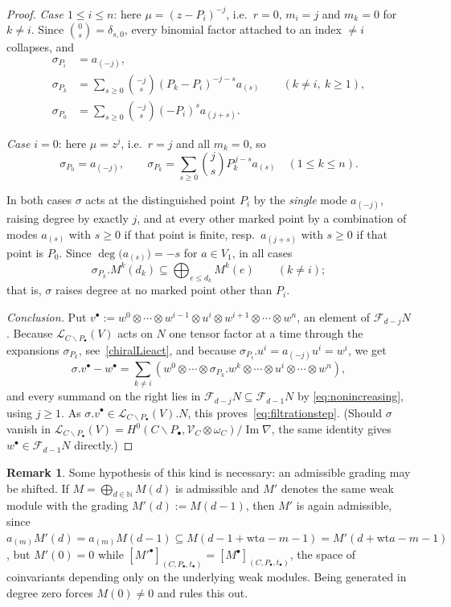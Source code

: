 \documentclass[12pt,a4paper,reqno]{amsart}
\numberwithin{equation}{section}
\theoremstyle{definition}
\newtheorem{remark}[theorem]{Remark}
\newcommand{\im}{\operatorname{Im}}
\newcommand{\N}{\mathbb{N}}
\newcommand{\LL}{\mathcal{L}}
\def\bs{\backslash}
\def\om{\omega}
\def\o{\otimes}
\def\wt{\mathrm{wt}}
\def\ssq{\subseteq}
\def\si{\sigma}
\begin{document}
\begin{proof}
\emph{Case $1\leq i\leq n$}: here $\mu=(z-P_i)^{-j}$, i.e.\ $r=0$, $m_i=j$ and $m_k=0$ for
$k\neq i$. Since $\binom{0}{s}=\delta_{s,0}$, every binomial factor attached to an index
$\neq i$ collapses, and
\begin{align*}
\si_{P_i}&=a_{(-j)},\\
\si_{P_k}&=\sum_{s\geq 0}\binom{-j}{s}(P_k-P_i)^{-j-s}a_{(s)}\qquad (k\neq i,\ k\geq 1),\\
\si_{P_0}&=\sum_{s\geq 0}\binom{-j}{s}(-P_i)^{s}a_{(j+s)}.
\end{align*}

\emph{Case $i=0$}: here $\mu=z^{j}$, i.e.\ $r=j$ and all $m_k=0$, so
\[
\si_{P_0}=a_{(-j)},\qquad
\si_{P_k}=\sum_{s\geq 0}\binom{j}{s}P_k^{\,j-s}a_{(s)}\quad (1\leq k\leq n).
\]

In both cases $\si$ acts at the distinguished point $P_i$ by the \emph{single} mode
$a_{(-j)}$, raising degree by exactly $j$, and at every other marked point by a combination
of modes $a_{(s)}$ with $s\geq 0$ if that point is finite, resp.\ $a_{(j+s)}$ with $s\geq 0$
if that point is $P_0$. Since $\deg\big(a_{(s)}\big)=-s$ for $a\in V_1$, in all cases
\begin{equation}\label{eq:nonincreasing}
\si_{P_k}.M^k(d_k)\ssq \bigoplus_{e\leq d_k}M^k(e)\qquad (k\neq i);
\end{equation}
that is, $\si$ raises degree at no marked point other than $P_i$.

\emph{Conclusion.} Put $v^\bullet:=w^0\o\cdots\o w^{i-1}\o u^i\o w^{i+1}\o\cdots\o w^n$, an
element of $\mathcal F_{d-j}N$. Because $\LL_{C\bs P_\bullet}(V)$ acts on $N$ one tensor
factor at a time through the expansions $\si_{P_k}$, see~\eqref{chiralLieact}, and because
$\si_{P_i}.u^i=a_{(-j)}u^i=w^i$, we get
\[
\si.v^\bullet-w^\bullet
=\sum_{k\neq i}\left(w^0\o\cdots\o \si_{P_k}.w^k\o\cdots\o u^i\o\cdots\o w^n\right),
\]
and every summand on the right lies in $\mathcal F_{d-j}N\ssq \mathcal F_{d-1}N$ by
\eqref{eq:nonincreasing}, using $j\geq 1$. As
$\si.v^\bullet\in \LL_{C\bs P_\bullet}(V).N$, this proves~\eqref{eq:filtrationstep}.
(Should $\si$ vanish in
$\LL_{C\bs P_\bullet}(V)=H^0(C\bs P_\bullet,\mathscr{V}_C\o\om_C)/\im\nabla$, the same identity
gives $w^\bullet\in\mathcal F_{d-1}N$ directly.)
\end{proof}

\begin{remark}\label{rmk:bottomgen_necessary}
Some hypothesis of this kind is necessary: an admissible grading may be shifted. If
$M=\bigoplus_{d\in\N}M(d)$ is admissible and $M'$ denotes the same weak module with the
grading $M'(d):=M(d-1)$, then $M'$ is again admissible, since
$a_{(m)}M'(d)=a_{(m)}M(d-1)\ssq M(d-1+\wt a-m-1)=M'(d+\wt a-m-1)$, but $M'(0)=0$ while
$[M'^\bullet]_{(C,P_\bullet,t_\bullet)}=[M^\bullet]_{(C,P_\bullet,t_\bullet)}$, the space of
coinvariants depending only on the underlying weak modules. Being generated in degree zero
forces $M(0)\neq 0$ and rules this out.
\end{remark}
\end{document}
